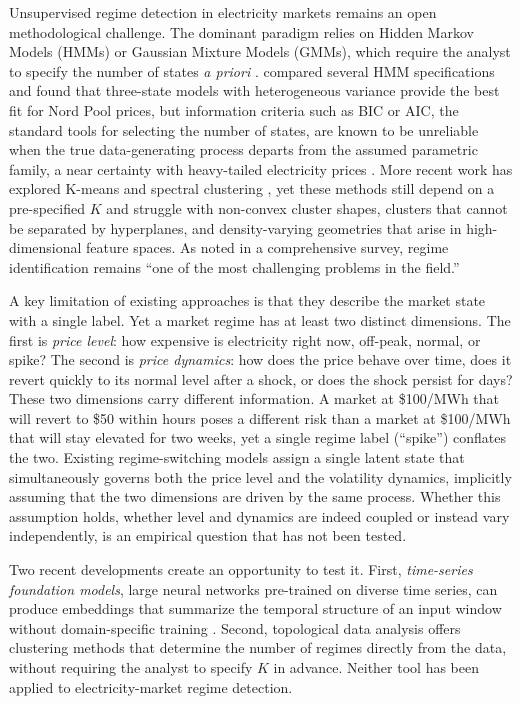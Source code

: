 \documentclass[12pt]{article}
\begin{document}
Unsupervised regime detection in electricity markets remains an open methodological challenge.
The dominant paradigm relies on Hidden Markov Models (HMMs) or Gaussian Mixture Models (GMMs), which require the analyst to specify the number of states \emph{a priori} \citep{mount2006, kanamura2009}.
\citet{janczura2013} compared several HMM specifications and found that three-state models with heterogeneous variance provide the best fit for Nord Pool prices, but information criteria such as BIC or AIC, the standard tools for selecting the number of states, are known to be unreliable when the true data-generating process departs from the assumed parametric family, a near certainty with heavy-tailed electricity prices \citep{bierbrauer2007}.
More recent work has explored K-means and spectral clustering \citep{rintamaki2017}, yet these methods still depend on a pre-specified $K$ and struggle with non-convex cluster shapes, clusters that cannot be separated by hyperplanes, and density-varying geometries that arise in high-dimensional feature spaces.
As \citet{weron2014} noted in a comprehensive survey, regime identification remains ``one of the most challenging problems in the field.''


A key limitation of existing approaches is that they describe the market state with a single label.
Yet a market regime has at least two distinct dimensions.
The first is \emph{price level}: how expensive is electricity right now, off-peak, normal, or spike?
The second is \emph{price dynamics}: how does the price behave over time, does it revert quickly to its normal level after a shock, or does the shock persist for days?
These two dimensions carry different information.
A market at \$100/MWh that will revert to \$50 within hours poses a different risk than a market at \$100/MWh that will stay elevated for two weeks, yet a single regime label (``spike'') conflates the two.
Existing regime-switching models \citep{huisman2003} assign a single latent state that simultaneously governs both the price level and the volatility dynamics, implicitly assuming that the two dimensions are driven by the same process.
Whether this assumption holds, whether level and dynamics are indeed coupled or instead vary independently, is an empirical question that has not been tested.


Two recent developments create an opportunity to test it.
First, \emph{time-series foundation models}, large neural networks pre-trained on diverse time series, can produce embeddings that summarize the temporal structure of an input window without domain-specific training \citep{yeh2023}.
Second, topological data analysis offers clustering methods that determine the number of regimes directly from the data, without requiring the analyst to specify $K$ in advance.
Neither tool has been applied to electricity-market regime detection.
\end{document}
